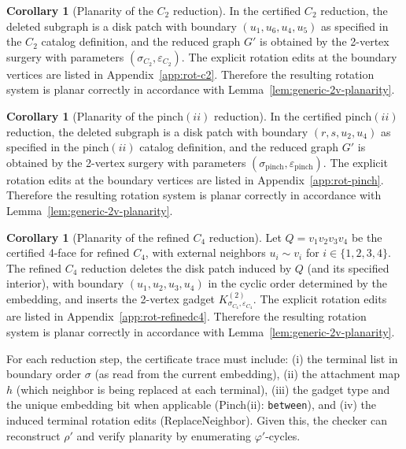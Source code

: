\documentclass[12pt]{article}
\theoremstyle{definition}
\newtheorem{corollary}[theorem]{Corollary}
\newcommand{\RefinedCFourGadgetVertices}{2}
\newcommand{\CtwoGadgetVertices}{2}
\newcommand{\PinchGadgetVertices}{2}
\begin{document}
\begin{corollary}[Planarity of the $C_2$ reduction]
\label{cor:planar-C2}
In the certified $C_2$ reduction, the deleted subgraph is a disk patch with boundary
$(u_1,u_6,u_4,u_5)$ as specified in the $C_2$ catalog definition, and the reduced graph $G'$
is obtained by the \CtwoGadgetVertices-vertex surgery with parameters $(\sigma_{C_2},\varepsilon_{C_2})$.
The explicit rotation edits at the boundary vertices are listed in Appendix~\ref{app:rot-c2}.
Therefore the resulting rotation system is planar correctly in accordance with Lemma~\ref{lem:generic-2v-planarity}.
\end{corollary}

\begin{corollary}[Planarity of the $\mathrm{pinch}(ii)$ reduction]
\label{cor:planar-pinchii}
In the certified $\mathrm{pinch}(ii)$ reduction, the deleted subgraph is a disk patch with boundary
$(r,s,u_2,u_4)$ as specified in the $\mathrm{pinch}(ii)$ catalog definition, and the reduced graph $G'$
is obtained by the \PinchGadgetVertices-vertex surgery with parameters $(\sigma_{\mathrm{pinch}},\varepsilon_{\mathrm{pinch}})$.
The explicit rotation edits at the boundary vertices are listed in Appendix~\ref{app:rot-pinch}.
Therefore the resulting rotation system is planar correctly in accordance with Lemma~\ref{lem:generic-2v-planarity}.
\end{corollary}

\begin{corollary}[Planarity of the refined $C_4$ reduction]
\label{cor:planar-refinedC4}
Let $Q=v_1v_2v_3v_4$ be the certified 4-face for refined $C_4$, with external neighbors
$u_i\sim v_i$ for $i\in\{1,2,3,4\}$.
The refined $C_4$ reduction deletes the disk patch induced by $Q$ (and its specified interior),
with boundary $(u_1,u_2,u_3,u_4)$ in the cyclic order determined by the embedding,
and inserts the \RefinedCFourGadgetVertices-vertex gadget $K^{(\RefinedCFourGadgetVertices)}_{\sigma_{C_4},\varepsilon_{C_4}}$.
The explicit rotation edits are listed in Appendix~\ref{app:rot-refinedc4}.
Therefore the resulting rotation system is planar correctly in accordance with Lemma~\ref{lem:generic-2v-planarity}.
\end{corollary}



\begin{remark}
For each reduction step, the certificate trace must include:
(i) the terminal list in boundary order $\sigma$ (as read from the current embedding),
(ii) the attachment map $h$ (which neighbor is being replaced at each terminal),
(iii) the gadget type and the unique embedding bit when applicable (Pinch(ii): \texttt{between}),
and (iv) the induced terminal rotation edits (ReplaceNeighbor).
Given this, the checker can reconstruct $\rho'$ and verify planarity by enumerating $\varphi'$-cycles.
\end{remark}
\end{document}
